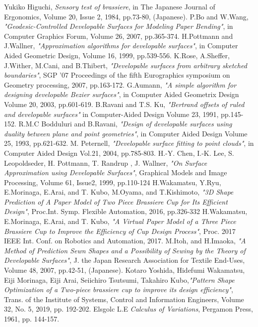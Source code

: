 \documentclass[E]{scitrans}
\begin{document}
\begin{thebibliography}{99}
	
	Yukiko Higuchi, {\it Sensory test of brassiere}, in The Japanese Journal of Ergonomics, Volume 20, Issue 2, 1984, pp.73-80, (Japanese).
	 P.Bo and W.Wang, {\it "Geodesic-Controlled Developable Surfaces for Modeling Paper Bending"}, in Computer Graphics Forum, Volume 26, 2007, pp.365-374.
	 H.Pottmann and J.Wallner, {\it "Approximation algorithms for developable surfaces"}, in Computer Aided Geometric Design, Volume 16, 1999, pp.539-556.
	 K.Rose, A.Sheffer, J.Wither, M.Cani, and B.Thibert, {\it "Developable surfaces from arbitrary sketched boundaries"}, SGP ’07 Proceedings of the ﬁfth Eurographics symposium on Geometry processing, 2007, pp.163-172.
	 G.Aumann, {\it "A simple algorithm for designing developable Bezier surfaces"}, in Computer Aided Geometrix Design Volume 20, 2003, pp.601-619.
	 B.Ravani and T.S. Ku, {\it "Bertrand offsets of ruled and developable surfaces"} in Computer-Aided Design Volume 23, 1991, pp.145-152. 
	R.M.C Bodduluri and B.Ravani, {\it "Design of developable surfaces using duality between plane and point geometries"}, in Computer Aided Design Volume 25, 1993, pp.621-632.
	M. Peternell, {\it "Developable surface fitting to point clouds"}, in Computer Aided Design Vol.21, 2004, pp.785-803.
	H.-Y. Chen, I.-K. Lee, S. Leopoldseder, H. Pottmann, T. Randrup , J. Wallner, {\it "On Surface Approximation using Developable Surfaces"}, Graphical Models and Image Processing, Volume 61, Issue2, 1999, pp.110-124
	 H.Wakamatsu, Y.Ryu, E.Morinaga, E.Arai, and T. Kubo, M.Oyama, and T.Kishimoto, {\it "3D Shape Prediction of A Paper Model of Two Piece Brassiere Cup for Its Efficient Design"}, Proc.Int. Symp. Flexible Automation, 2016, pp.326-332
	 H.Wakamatsu, E.Morinaga, E.Arai, and T. Kubo, {\it "A Virtual Paper Model of a Three Piece Brassiere Cup to Improve the Efficiency of Cup Design Process"}, Proc. 2017 IEEE Int. Conf. on Robotics and Automation, 2017. 
	M.Itoh, and H.Imaoka, {\it "A Method of Prediction Sewn Shapes and a Possibility of Sewing by the Theory of Developable Surfaces"}, J. the Japan Research Association for Textile End-Uses, Volume 48, 2007, pp.42-51, (Japanese).
	 Kotaro Yoshida, Hidefumi Wakamatsu, Eiji Morinaga, Eiji Arai, Seiichiro Tsutsumi, Takahiro Kubo,{\it "Pattern Shape Optimization of a Two-piece brassiere cup to improve its design efficiency"}, Trans. of the Institute of Systems, Control and Information Engineers, Volume 32, No. 5, 2019, pp. 192-202.
	Elsgolc L.E {\it Calculus of Variations}, Pergamon Press, 1961, pp. 144-157.
\end{thebibliography}
\end{document}
